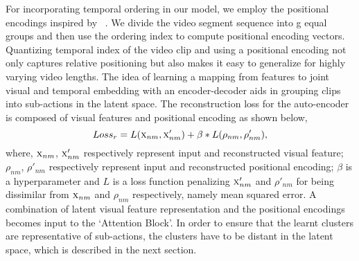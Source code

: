 \documentclass[final]{cvpr}
\begin{document}
For incorporating temporal ordering in our model, we employ the positional encodings inspired by ~\cite{vaswani2017attention}.
We divide the video segment sequence into g equal groups and then use the ordering index to compute positional encoding vectors. Quantizing  temporal index of the video clip and using a positional encoding not only captures relative positioning but also makes it easy to generalize for highly varying video lengths. The idea of learning a mapping from features to joint visual and temporal embedding with an encoder-decoder aids in grouping clips into sub-actions in the latent space. The reconstruction loss for the auto-encoder is composed of visual features and positional encoding as shown below,
\begin{equation}
    Loss_{r} = L(\textsc{x}_{nm}, \textsc{x}'_{nm}) + \beta * L(\rho_{nm}, \rho'_{nm}), 
\end{equation}
where, $\textsc{x}_{nm}$, $\textsc{x}'_{nm}$ respectively represent input and  reconstructed visual feature; $\rho_{nm}$, $\rho'_{nm}$ respectively represent input and reconstructed positional encoding; $\beta$ is a hyperparameter and  $L$ is a loss function penalizing $\textsc{x}'_{nm}$ and $\rho'_{nm}$ for being dissimilar from $\textsc{x}_{nm}$ and $\rho_{nm}$ respectively, namely mean squared error. A combination of latent visual feature representation and the positional encodings becomes input to the `Attention Block'. In order to ensure that the learnt clusters are representative of sub-actions, the clusters have to be distant in the latent space, which is described in the next section.
\end{document}
